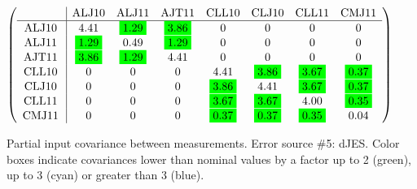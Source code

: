 \begin{table}[H]
\scriptsize
\begin{center}
\renewcommand{\arraystretch}{1.1}
\begin{math}\left(\begin{array}{c|ccccccc}
 & \mathrm{ALJ10} & 
\mathrm{ALJ11} & 
\mathrm{AJT11} & 
\mathrm{CLL10} & 
\mathrm{CLJ10} & 
\mathrm{CLL11} & 
\mathrm{CMJ11} \\
\hline
\mathrm{ALJ10} \hspace*{2pt} &       4.41 &  \colorbox{Green1}{$      1.29$} &  \colorbox{Green1}{$      3.86$} &  0 &  0 &  0 &  0 \\
\mathrm{ALJ11} \hspace*{2pt} &  \colorbox{Green1}{$      1.29$} &       0.49 &  \colorbox{Green1}{$      1.29$} &  0 &  0 &  0 &  0 \\
\mathrm{AJT11} \hspace*{2pt} &  \colorbox{Green1}{$      3.86$} &  \colorbox{Green1}{$      1.29$} &       4.41 &  0 &  0 &  0 &  0 \\
\mathrm{CLL10} \hspace*{2pt} &  0 &  0 &  0 &       4.41 &  \colorbox{Green1}{$      3.86$} &  \colorbox{Green1}{$      3.67$} &  \colorbox{Green1}{$      0.37$} \\
\mathrm{CLJ10} \hspace*{2pt} &  0 &  0 &  0 &  \colorbox{Green1}{$      3.86$} &       4.41 &  \colorbox{Green1}{$      3.67$} &  \colorbox{Green1}{$      0.37$} \\
\mathrm{CLL11} \hspace*{2pt} &  0 &  0 &  0 &  \colorbox{Green1}{$      3.67$} &  \colorbox{Green1}{$      3.67$} &       4.00 &  \colorbox{Green1}{$      0.35$} \\
\mathrm{CMJ11} \hspace*{2pt} &  0 &  0 &  0 &  \colorbox{Green1}{$      0.37$} &  \colorbox{Green1}{$      0.37$} &  \colorbox{Green1}{$      0.35$} &       0.04 \\
\end{array}\right)\end{math}
\caption{Partial input covariance between measurements. Error source \#5: dJES. Color boxes indicate covariances lower than nominal values by a factor up to 2 (green), up to 3 (cyan) or greater than 3 (blue).}
\renewcommand{\arraystretch}{1}
\end{center}
\end{table}
